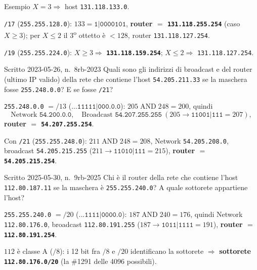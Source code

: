 \documentclass{report}
\begin{document}
\begin{solution}
Esempio $X=3 \Rightarrow$ host \texttt{131.118.133.0}.

\texttt{/17} (\texttt{255.255.128.0}): $133=\texttt{1|0000101}$,
\textbf{router $=$ \texttt{131.118.255.254}} (caso $X\ge 3$); per $X\le 2$ il
3\textsuperscript{o} ottetto è $<128$, router \texttt{131.118.127.254}.

\texttt{/19} (\texttt{255.255.224.0}): $X\ge 3 \Rightarrow$
\textbf{\texttt{131.118.159.254}}; $X\le 2 \Rightarrow$ \texttt{131.118.127.254}.
\end{solution}

\begin{Exercise}{Scritto 2023-05-26, n.\ 8}{rb-2023}
Quali sono gli indirizzi di broadcast e del router (ultimo IP valido) della rete
che contiene l'host \texttt{54.205.211.33} se la maschera fosse
\texttt{255.248.0.0}? E se fosse \texttt{/21}?
\end{Exercise}

\begin{solution}
\texttt{255.248.0.0} $=/13$ ($\texttt{...11111|000.0.0}$):
$205\;\text{AND}\;248 = 200$, quindi
\[
\text{Network }\texttt{54.200.0.0},\quad
\text{Broadcast }\texttt{54.207.255.255}\ (205\to\texttt{11001|111}=207),
\]
\textbf{router $=$ \texttt{54.207.255.254}}.

\medskip
Con \texttt{/21} (\texttt{255.255.248.0}): $211\;\text{AND}\;248=208$,
Network \texttt{54.205.208.0}, broadcast \texttt{54.205.215.255}
($211\to\texttt{11010|111}=215$), \textbf{router $=$ \texttt{54.205.215.254}}.
\end{solution}

\begin{Exercise}{Scritto 2025-05-30, n.\ 9}{rb-2025}
Chi è il router della rete che contiene l'host \texttt{112.80.187.11} se la
maschera è \texttt{255.255.240.0}? A quale sottorete appartiene l'host?
\end{Exercise}

\begin{solution}
\texttt{255.255.240.0} $=/20$ ($\texttt{...1111|0000.0}$):
$187\;\text{AND}\;240=176$, quindi Network \texttt{112.80.176.0}, broadcast
\texttt{112.80.191.255} ($187\to\texttt{1011|1111}=191$),
\textbf{router $=$ \texttt{112.80.191.254}}.

\medskip
$112$ è classe A ($/8$): i 12 bit fra $/8$ e $/20$ identificano la sottorete
$\Rightarrow$ \textbf{sottorete \texttt{112.80.176.0/20}} (la \#1291 delle 4096
possibili).
\end{solution}
\end{document}

